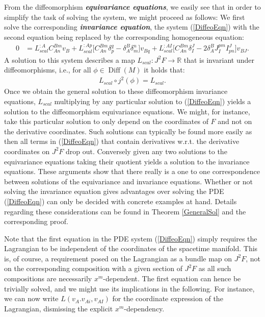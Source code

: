 From the diffeomorphism \textit{\textbf{equivariance equations}}, we easily see that in order to simplify the task of solving the system, we might proceed as follows:
We first solve the corresponding \textit{\textbf{invariance equation}}, the system (\ref{DiffeoEqn}) with the second equation being replaced by the corresponding homogeneous equation:
\begin{align}
    0 &= L_{scal}^{:A} C_{An}^{Bm} v_B + L_{scal}^{:Ap} \bigl[ C_{An}^{Bm} \delta_p^q - \delta_A^B \delta_m^n \bigr] v_{Bq} + L_{scal}^{:AI} \bigl[ C_{An}^{Bm} \delta_I^J - 2 \delta_A^B J_I^{pm} I^J_{pn}  \bigr] v_{BJ}.
\end{align}
A solution to this system describes a map $L_{scal}: J^2F \rightarrow \mathbb{R}$ that is invariant under diffeomorphisms, i.e., for all $\phi \in \operatorname{Diff}(M)$ it holds that:
\begin{align}
    L_{scal} \circ j^2(\phi) = L_{scal}.
\end{align}
Once we obtain the general solution to these diffeomorphism invariance equations, $L_{scal}$ multiplying by any particular solution to (\ref{DiffeoEqn}) yields a solution to the diffeomorphism equivariance equations. We might, for instance, take this particular solution to only depend on the coordinates of $F$ and not on the derivative coordinates. Such solutions can typically be found more easily as then all terms in (\ref{DiffeoEqn}) that contain derivatives w.r.t. the derivative coordinates on $J^2F$ drop out. Conversely given any two solutions to the equivariance equations taking their quotient yields a solution to the invariance equations. These arguments show that there really is a one to one correspondence between solutions of the equivariance and invariance equations. Whether or not solving the invariance equation gives advantages over solving the PDE (\ref{DiffeoEqn}) can only be decided with concrete examples at hand. Details regarding these considerations can be found in Theorem \ref{GeneralSol} and the corresponding proof. 

Note that the first equation in the PDE system (\ref{DiffeoEqn}) simply requires the Lagrangian to be independent of the coordinates of the spacetime manifold. This is, of course, a requirement posed on the Lagrangian as a bundle map on $J^2F$, not on the corresponding composition with a given section of $J^2F$ as all such compositions are necessarily $x^m$-dependent. The first equation can hence be trivially solved, and we might use its implications in the following. For instance, we can now write $L(v_A.v_{Ai},v_{AI})$ for the coordinate expression of the Lagrangian, dismissing the explicit $x^m$-dependency.

